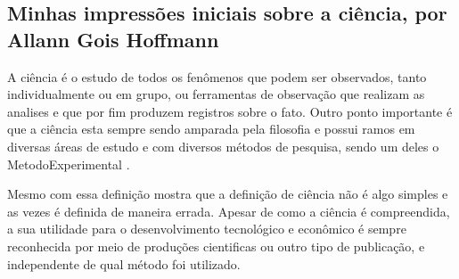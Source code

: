\subsection{Minhas impressões iniciais sobre a ciência, por Allann Gois Hoffmann}

A ciência é o estudo de todos os fenômenos que podem ser observados, tanto individualmente ou em grupo, ou ferramentas de observação que realizam as analises e que por fim produzem registros sobre o fato. Outro ponto importante é que a ciência esta sempre sendo amparada pela filosofia e possui ramos em diversas áreas de estudo e com diversos métodos de pesquisa, sendo um deles o \gls{MetodoExperimental} \citep{rabelo_o_2011}.

Mesmo com essa definição \citet{schwartzman_ciencia_1984} mostra que a definição de ciência não é algo simples e as vezes é definida de maneira errada. Apesar de como a ciência é compreendida, a sua utilidade para o desenvolvimento tecnológico e econômico é sempre reconhecida por meio de produções cientificas ou outro tipo de publicação, e independente de qual método foi utilizado.